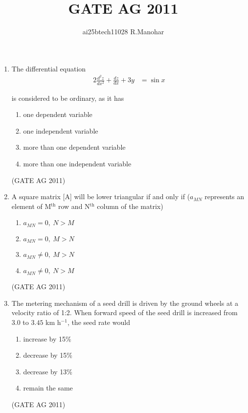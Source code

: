 \documentclass[journal,12pt,onecolumn]{IEEEtran}
\title{GATE AG 2011}
\author{ai25btech11028 R.Manohar}
\theoremstyle{remark}
\begin{document}
\maketitle



\begin{enumerate}
    
\item The differential equation
\begin{align*}
  2\frac{d^{2}z}{dx^{2}} + \frac{dz}{dx} + 3y &= \sin x
\end{align*}

is considered to be ordinary, as it has
\begin{multicols}{4}
\begin{enumerate}
\item one dependent variable
\item one independent variable
\item more than one dependent variable
\item more than one independent variable
\end{enumerate}
\end{multicols}
\hfill{(GATE AG 2011)}

\item A square matrix [A] will be lower triangular if and only if ($a_{MN}$ represents an element of M$^{\text{th}}$ row and N$^{\text{th}}$ column of the matrix)
\begin{enumerate}
\item $a_{MN} = 0, \ N > M$
\item $a_{MN} = 0, \ M > N$
\item $a_{MN} \neq 0, \ M > N$
\item $a_{MN} \neq 0, \ N > M$
\end{enumerate}
\hfill{(GATE AG 2011)}

\item The metering mechanism of a seed drill is driven by the ground wheels at a velocity ratio of 1:2.  
When forward speed of the seed drill is increased from $3.0$ to $3.45$ km h$^{-1}$, the seed rate would
\begin{multicols}{4}
\begin{enumerate}
\item increase by 15\%
\item decrease by 15\%
\item decrease by 13\%
\item remain the same
\end{enumerate}
\end{multicols}
\hfill{(GATE AG 2011)}


\end{enumerate}
\end{document}
